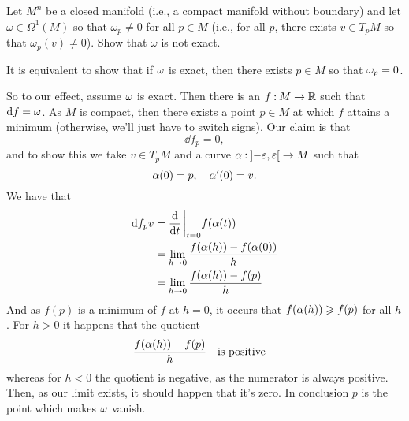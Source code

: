 \documentclass[12pt]{memoir}
\begin{document}
\begin{Ej}
    Let $M^n$ be a closed manifold (i.e., a compact manifold without boundary) and let $\omega \in \Omega^1(M)$ so that $\omega_p \neq 0$ for all $p \in M$ (i.e., for all $p$, there exists $v \in T_pM$ so that $\omega_p(v) \neq 0$). Show that $\omega$ is not exact.
\end{Ej}
\begin{ptcbr}
 It is equivalent to show that if $\omega$ is exact, then there exists $p\in M$ so that $\omega_p=0$.\par
So to our effect, assume $\omega$ is exact. Then there is an $f\mathbin{:} M\to\mathbb{R}$ such that $\dd f=\omega$. As $M$ is compact, then there exists a point $p\in M$ at which $f$ attains a minimum (otherwise, we'll just have to switch signs). Our claim is that 
$$\dd f_p=0,$$
and to show this we take $v\in T_pM$ and a curve $\alpha\mathbin{:}\left\rbrack-\varepsilon,\varepsilon\right\lbrack\to M$ such that 
$$\alpha(0)=p,\quad\alpha'(0)=v.$$
We have that 
\begin{align*}
    \dd f_pv&=\dv{t}\eval_{t=0}f(\al(t))\\
    &=\lim_{h\to 0}\frac{f(\al(h))-f(\al(0))}{h}\\
    &=\lim_{h\to 0}\frac{f(\al(h))-f(p)}{h}
\end{align*}
And as $f(p)$ is a minimum of $f$ at $h=0$, it occurs that $f(\alpha(h))\geqslant f(p)$ for all $h$. For $h>0$ it happens that the quotient 
$$\frac{f(\alpha(h))-f(p)}{h}\quad\text{is positive}\quad$$
whereas for $h<0$ the quotient is negative, as the numerator is always positive. Then, as our limit exists, it should happen that it's zero. In conclusion $p$ is the point which makes $\omega$ vanish.
\end{ptcbr}
\end{document}
